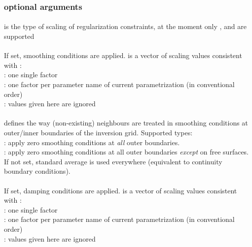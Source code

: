 \subsubsection{optional arguments}
\paragraph{}
 is the type of scaling of regularization constraints, at the moment only 
,  and  are supported
\paragraph{}
If set, smoothing conditions are applied.  is a vector of scaling values consistent 
with :\\
: one single factor\\
: one factor per parameter name of current parametrization (in conventional order)\\
 : values given here are ignored
\paragraph{}
 defines the way (non-existing) neighbours are treated in smoothing conditions at outer/inner 
boundaries of the inversion grid. Supported types:\\
: apply zero smoothing conditions at \emph{all} outer boundaries.\\
: apply zero smoothing conditions at all outer boundaries \emph{except} on free surfaces. \\
If not set, standard average is used everywhere (equivalent to continuity boundary conditions).
\paragraph{}
If set, damping conditions are applied.  is a vector of scaling values consistent 
with :\\
: one single factor\\
: one factor per parameter name of current parametrization (in conventional order)\\
 : values given here are ignored
